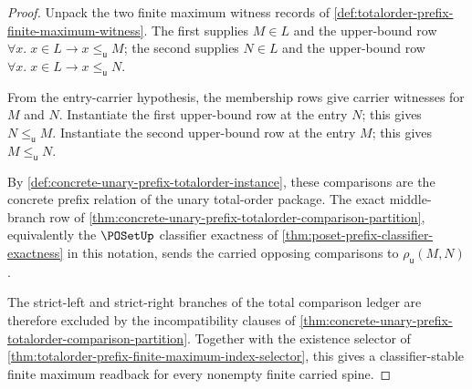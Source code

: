 \begin{proof}
Unpack the two finite maximum witness records of \autoref{def:totalorder-prefix-finite-maximum-witness}. The first supplies $M\in L$ and the upper-bound row $\forall x.\; x\in L\to x\le_{\mathsf{u}}M$; the second supplies $N\in L$ and the upper-bound row $\forall x.\; x\in L\to x\le_{\mathsf{u}}N$.

From the entry-carrier hypothesis, the membership rows give carrier witnesses for $M$ and $N$. Instantiate the first upper-bound row at the entry $N$; this gives $N\le_{\mathsf{u}}M$. Instantiate the second upper-bound row at the entry $M$; this gives $M\le_{\mathsf{u}}N$.

By \autoref{def:concrete-unary-prefix-totalorder-instance}, these comparisons are the concrete prefix relation of the unary total-order package. The exact middle-branch row of \autoref{thm:concrete-unary-prefix-totalorder-comparison-partition}, equivalently the $\POSetUp$ classifier exactness of \autoref{thm:poset-prefix-classifier-exactness} in this notation, sends the carried opposing comparisons to $\rho_{\mathsf{u}}(M,N)$.

The strict-left and strict-right branches of the total comparison ledger are therefore excluded by the incompatibility clauses of \autoref{thm:concrete-unary-prefix-totalorder-comparison-partition}. Together with the existence selector of \autoref{thm:totalorder-prefix-finite-maximum-index-selector}, this gives a classifier-stable finite maximum readback for every nonempty finite carried spine.
\end{proof}

